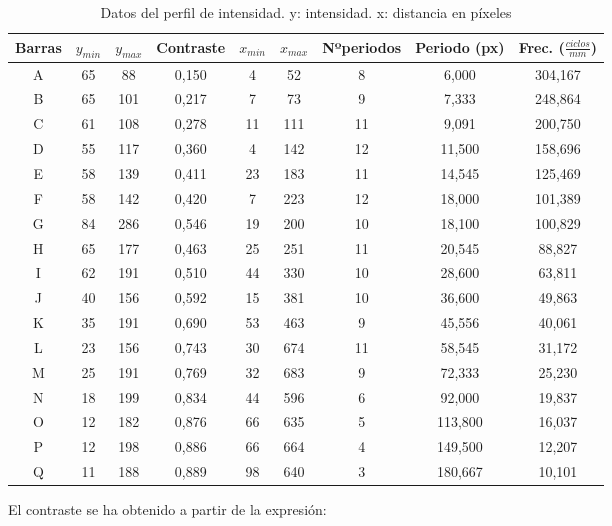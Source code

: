 \documentclass[12pt,a5paper]{article}
\begin{document}
\begin{table}[!ht]
    \centering
    \begin{tabular}{|c|c|c|c|c|c|c|c|c|}
    \hline
        Barras & $y_{min}$ & $y_{max}$ & Contraste & $x_{min}$ & $x_{max}$ & Nºperiodos & Periodo (px) & Frec. ($\frac{ciclos}{mm}$) \\ \hline
        A & 65 & 88 & 0,150 & 4 & 52 & 8 & 6,000 & 304,167 \\ \hline
        B & 65 & 101 & 0,217 & 7 & 73 & 9 & 7,333 & 248,864 \\ \hline
        C & 61 & 108 & 0,278 & 11 & 111 & 11 & 9,091 & 200,750 \\ \hline
        D & 55 & 117 & 0,360 & 4 & 142 & 12 & 11,500 & 158,696 \\ \hline
        E & 58 & 139 & 0,411 & 23 & 183 & 11 & 14,545 & 125,469 \\ \hline
        F & 58 & 142 & 0,420 & 7 & 223 & 12 & 18,000 & 101,389 \\ \hline
        G & 84 & 286 & 0,546 & 19 & 200 & 10 & 18,100 & 100,829 \\ \hline
        H & 65 & 177 & 0,463 & 25 & 251 & 11 & 20,545 & 88,827 \\ \hline
        I & 62 & 191 & 0,510 & 44 & 330 & 10 & 28,600 & 63,811 \\ \hline
        J & 40 & 156 & 0,592 & 15 & 381 & 10 & 36,600 & 49,863 \\ \hline
        K & 35 & 191 & 0,690 & 53 & 463 & 9 & 45,556 & 40,061 \\ \hline
        L & 23 & 156 & 0,743 & 30 & 674 & 11 & 58,545 & 31,172 \\ \hline
        M & 25 & 191 & 0,769 & 32 & 683 & 9 & 72,333 & 25,230 \\ \hline
        N & 18 & 199 & 0,834 & 44 & 596 & 6 & 92,000 & 19,837 \\ \hline
        O & 12 & 182 & 0,876 & 66 & 635 & 5 & 113,800 & 16,037 \\ \hline
        P & 12 & 198 & 0,886 & 66 & 664 & 4 & 149,500 & 12,207 \\ \hline
        Q & 11 & 188 & 0,889 & 98 & 640 & 3 & 180,667 & 10,101 \\ \hline
    \end{tabular}
    \caption{\small Datos del perfil de intensidad. y: intensidad. x: distancia en píxeles}
    \label{table:perfilintensidad}
\end{table}

El contraste se ha obtenido a partir de la expresión:
\end{document}
